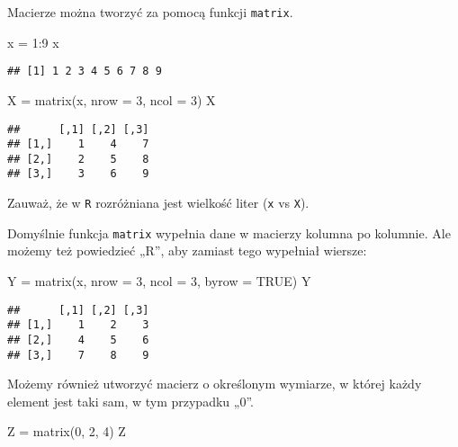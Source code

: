 \documentclass[
]{article}
\newenvironment{Shaded}{\begin{snugshade}}{\end{snugshade}}
\newcommand{\AttributeTok}[1]{\textcolor[rgb]{0.77,0.63,0.00}{#1}}
\newcommand{\ConstantTok}[1]{\textcolor[rgb]{0.00,0.00,0.00}{#1}}
\newcommand{\DecValTok}[1]{\textcolor[rgb]{0.00,0.00,0.81}{#1}}
\newcommand{\FunctionTok}[1]{\textcolor[rgb]{0.00,0.00,0.00}{#1}}
\newcommand{\NormalTok}[1]{#1}
\newcommand{\OtherTok}[1]{\textcolor[rgb]{0.56,0.35,0.01}{#1}}
\newcommand{\SpecialCharTok}[1]{\textcolor[rgb]{0.00,0.00,0.00}{#1}}
\begin{document}
Macierze można tworzyć za pomocą funkcji \texttt{matrix}.

\begin{Shaded}
\begin{Highlighting}[]
\NormalTok{x }\OtherTok{=} \DecValTok{1}\SpecialCharTok{:}\DecValTok{9}
\NormalTok{x}
\end{Highlighting}
\end{Shaded}

\begin{verbatim}
## [1] 1 2 3 4 5 6 7 8 9
\end{verbatim}

\begin{Shaded}
\begin{Highlighting}[]
\NormalTok{X }\OtherTok{=} \FunctionTok{matrix}\NormalTok{(x, }\AttributeTok{nrow =} \DecValTok{3}\NormalTok{, }\AttributeTok{ncol =} \DecValTok{3}\NormalTok{)}
\NormalTok{X}
\end{Highlighting}
\end{Shaded}

\begin{verbatim}
##      [,1] [,2] [,3]
## [1,]    1    4    7
## [2,]    2    5    8
## [3,]    3    6    9
\end{verbatim}

Zauważ, że w \texttt{R} rozróżniana jest wielkość liter (\texttt{x} vs
\texttt{X}).

Domyślnie funkcja \texttt{matrix} wypełnia dane w macierzy kolumna po
kolumnie. Ale możemy też powiedzieć „R'', aby zamiast tego wypełniał
wiersze:

\begin{Shaded}
\begin{Highlighting}[]
\NormalTok{Y }\OtherTok{=} \FunctionTok{matrix}\NormalTok{(x, }\AttributeTok{nrow =} \DecValTok{3}\NormalTok{, }\AttributeTok{ncol =} \DecValTok{3}\NormalTok{, }\AttributeTok{byrow =} \ConstantTok{TRUE}\NormalTok{)}
\NormalTok{Y}
\end{Highlighting}
\end{Shaded}

\begin{verbatim}
##      [,1] [,2] [,3]
## [1,]    1    2    3
## [2,]    4    5    6
## [3,]    7    8    9
\end{verbatim}

Możemy również utworzyć macierz o określonym wymiarze, w której każdy
element jest taki sam, w tym przypadku „0''.

\begin{Shaded}
\begin{Highlighting}[]
\NormalTok{Z }\OtherTok{=} \FunctionTok{matrix}\NormalTok{(}\DecValTok{0}\NormalTok{, }\DecValTok{2}\NormalTok{, }\DecValTok{4}\NormalTok{)}
\NormalTok{Z}
\end{Highlighting}
\end{Shaded}
\end{document}
